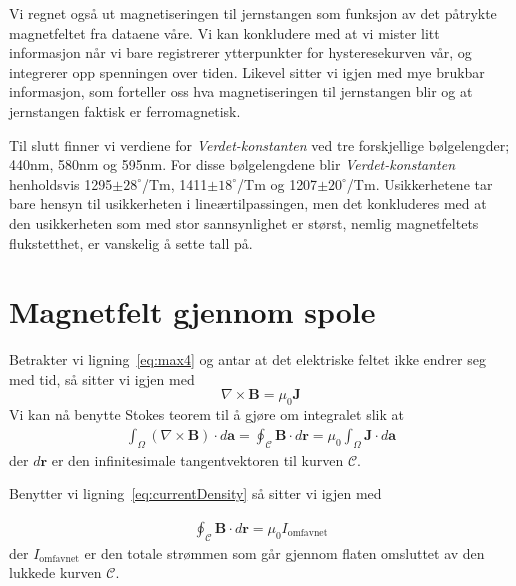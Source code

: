 \documentclass[a4paper,11pt, twocolumn]{article}
\begin{document}
Vi regnet også ut magnetiseringen til jernstangen som funksjon av det påtrykte magnetfeltet fra dataene våre. Vi kan konkludere med at vi mister litt informasjon når vi bare registrerer ytterpunkter for hysteresekurven vår, og integrerer opp spenningen over tiden. Likevel sitter vi igjen med mye brukbar informasjon, som forteller oss hva magnetiseringen til jernstangen blir og at jernstangen faktisk er ferromagnetisk. 

Til slutt finner vi verdiene for \textit{Verdet-konstanten} ved tre forskjellige bølgelengder; 440nm, 580nm og 595nm. For disse bølgelengdene blir \textit{Verdet-konstanten} henholdsvis 1295$\pm 28^\circ$/Tm, 1411$\pm18^\circ$/Tm og 1207$\pm20^\circ$/Tm. Usikkerhetene tar bare hensyn til usikkerheten i lineærtilpassingen, men det konkluderes med at den usikkerheten som med stor sannsynlighet er størst, nemlig magnetfeltets flukstetthet, er vanskelig å sette tall på.
\printbibliography
\onecolumn
\appendix


\section{Magnetfelt gjennom spole}
\label{app:magspole}
Betrakter vi ligning~\eqref{eq:max4} og antar at det elektriske feltet ikke endrer seg med tid, så sitter vi igjen med 
\begin{equation}
	\nabla\times\mathbf{B} = \mu_0\mathbf{J}
	\label{eq:independentOfTime}
\end{equation}
Vi kan nå benytte Stokes teorem til å gjøre om integralet slik at
\begin{align}
	\int_\Omega (\nabla\times\mathbf{B})\cdot d\mathbf{a} = \oint_\mathcal{C}\mathbf{B}\cdot d\mathbf{r}=\mu_0\int_\Omega \mathbf{J} \cdot d\mathbf{a} 
	\label{}
\end{align}
der $d\mathbf{r}$ er den infinitesimale tangentvektoren til kurven $\mathcal{C}$. 

Benytter vi ligning~\eqref{eq:currentDensity} så sitter vi igjen med 

\begin{align}
	\oint_\mathcal{C}\mathbf{B}\cdot d\mathbf{r}=\mu_0 I_\text{omfavnet}
	\label{eq:etterStokes}
\end{align}
der $I_\text{omfavnet}$ er den totale strømmen som går gjennom flaten omsluttet av den lukkede kurven $\mathcal{C}$.
\end{document}
